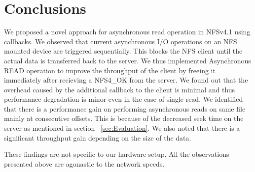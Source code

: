 \section{Conclusions}
\label{conc}
We proposed a novel approach for asynchronous read operation in NFSv4.1 using callbacks. We observed that current asynchronous I/O operations on an NFS mounted device are triggered sequentially. This blocks the NFS client until the actual data is transferred back to the server. We thus implemented Asynchronous READ operation to improve the throughput of the client by freeing it immediately after recieving a NFS4\_OK from the server. We found out that the overhead caused by the additional callback to the client is minimal and thus performance degradation is minor even in the case of single read. We identified that there is a performance gain on performing asynchronous reads on same file mainly at consecutive offsets. This is because of the decreased seek time on the server as mentioned in section ~\ref{sec:Evaluation}. We also noted that there is a significant throughput gain depending on the size of the data.  

These findings are not specific to our hardware setup. All the observations presented above are agonastic to the network speeds.    

